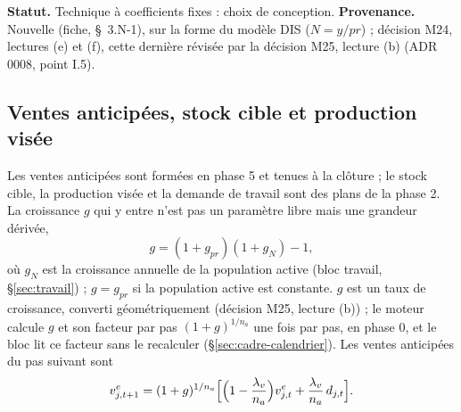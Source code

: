 \documentclass[11pt,a4paper]{article}
\begin{document}
\textbf{Statut.} Technique à coefficients fixes : choix de conception. \textbf{Provenance.} Nouvelle (fiche, \S~3.N-1), sur la forme du modèle DIS ($N = y/\mathit{pr}$) ; décision M24, lectures (e) et (f), cette dernière révisée par la décision M25, lecture (b) (ADR 0008, point I.5).

\subsection{Ventes anticipées, stock cible et production visée}
\label{sec:production-visee}
Les ventes anticipées sont formées en phase 5 et tenues à la clôture ; le stock cible, la production visée et la demande de travail sont des plans de la phase 2. La croissance $g$ qui y entre n'est pas un paramètre libre mais une grandeur dérivée,
\begin{equation*}
g = (1 + g_{\mathit{pr}})(1 + g_N) - 1 ,
\end{equation*}
où $g_N$ est la croissance annuelle de la population active (bloc travail, \S\ref{sec:travail}) ; $g = g_{\mathit{pr}}$ si la population active est constante. $g$ est un taux de croissance, converti géométriquement (décision M25, lecture (b)) ; le moteur calcule $g$ et son facteur par pas $(1 + g)^{1/n_a}$ une fois par pas, en phase 0, et le bloc lit ce facteur sans le recalculer (\S\ref{sec:cadre-calendrier}). Les ventes anticipées du pas suivant sont
\begin{equation}\label{eq:production-ventes-anticipees}
v^e_{j,t+1} = (1 + g)^{1/n_a}\Bigl[\Bigl(1 - \frac{\lambda_v}{n_a}\Bigr) v^e_{j,t} + \frac{\lambda_v}{n_a}\, d_{j,t}\Bigr] .
\end{equation}
\end{document}
